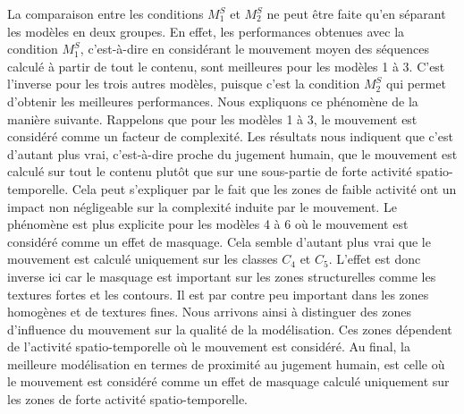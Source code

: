 La comparaison entre les conditions $M^S_1$ et $M^S_2$ ne peut être faite qu'en séparant les modèles en deux groupes. En effet, les performances obtenues avec la condition $M^S_1$, c'est-à-dire en considérant le mouvement moyen des séquences calculé à partir de tout le contenu, sont meilleures pour les modèles 1 à 3. C'est l'inverse pour les trois autres modèles, puisque c'est la condition $M^S_2$ qui permet d'obtenir les meilleures performances. Nous expliquons ce phénomène de la manière suivante. Rappelons que pour les modèles 1 à 3, le mouvement est considéré comme un facteur de complexité. Les résultats nous indiquent que c'est d'autant plus vrai, c'est-à-dire proche du jugement humain, que le mouvement est calculé sur tout le contenu plutôt que sur une sous-partie de forte activité spatio-temporelle. Cela peut s'expliquer par le fait que les zones de faible activité ont un impact non négligeable sur la complexité induite par le mouvement. Le phénomène est plus explicite pour les modèles 4 à 6 où le mouvement est considéré comme un effet de masquage. Cela semble d'autant plus vrai que le mouvement est calculé uniquement sur les classes $C_4$ et $C_5$. L'effet est donc inverse ici car le masquage est important sur les zones structurelles comme les textures fortes et les contours. Il est par contre peu important dans les zones homogènes et de textures fines. Nous arrivons ainsi à distinguer des zones d'influence du mouvement sur la qualité de la modélisation. Ces zones dépendent de l'activité spatio-temporelle où le mouvement est considéré. Au final, la meilleure modélisation en termes de proximité au jugement humain, est celle où le mouvement est considéré comme un effet de masquage calculé uniquement sur les zones de forte activité spatio-temporelle.

